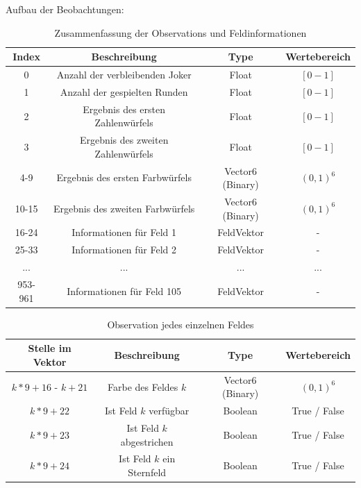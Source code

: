 Aufbau der Beobachtungen:
\begin{table}[!htbp]
    \centering
    \begin{tabular}{|c|c|c|c|}
    \hline
    \textbf{Index} & \textbf{Beschreibung} & \textbf{Type} & \textbf{Wertebereich} \\
    \hline
    0 & Anzahl der verbleibenden Joker & Float & $[0 - 1]$ \\
    \hline
    1 & Anzahl der gespielten Runden & Float & $[0 - 1]$ \\
    \hline
    2 & Ergebnis des ersten Zahlenwürfels & Float & $[0 - 1]$ \\
    \hline
    3 & Ergebnis des zweiten Zahlenwürfels & Float & $[0 - 1]$ \\
    \hline
    4-9 & Ergebnis des ersten Farbwürfels & Vector6 (Binary) & $(0, 1)^6$ \\
    \hline
    10-15 & Ergebnis des zweiten Farbwürfels & Vector6 (Binary) & $(0, 1)^6$ \\
    \hline
    16-24 & Informationen für Feld 1 & FeldVektor & - \\
    \hline
    25-33 & Informationen für Feld 2 & FeldVektor & - \\
    \hline
    ... & ... & ... & ... \\
    \hline
    953-961 & Informationen für Feld 105 & FeldVektor & - \\
    \hline
    \end{tabular}
    \caption{Zusammenfassung der Observations und Feldinformationen}
    \label{tab:Aufbau Beobachtungen}
\end{table}
    
\begin{table}[!htbp]
    \centering
    \begin{tabular}{|c|c|c|c|}
    \hline
    \textbf{Stelle im Vektor} & \textbf{Beschreibung} & \textbf{Type} & \textbf{Wertebereich} \\
    \hline
    $k*9+16$ - $k+21$ & Farbe des Feldes $k$ & Vector6 (Binary) & $(0, 1)^6$ \\
    \hline
    $k*9+22$ & Ist Feld $k$ verfügbar & Boolean & True / False \\
    \hline
    $k*9+23$ & Ist Feld $k$ abgestrichen & Boolean & True / False \\
    \hline
    $k*9+24$ & Ist Feld $k$ ein Sternfeld & Boolean & True / False \\
    \hline
    \end{tabular}
    \caption{Observation jedes einzelnen Feldes}
    \label{tab:Aufbau Feldvektor}
\end{table}

